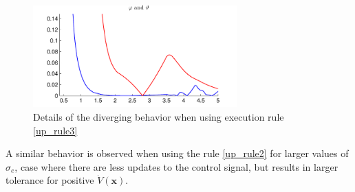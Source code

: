 \documentclass{article}
\begin{document}
			\begin{figure}
				\centering
				\includegraphics[width=0.7\textwidth]{event_detail1}
				\caption{Details of the diverging behavior when using execution rule \eqref{up_rule3} \label{event_details1}}
			\end{figure}
			A similar behavior is observed when using the rule \eqref{up_rule2} for larger values of $\sigma_e$, case where there are less updates to the control signal, but results in larger tolerance for positive $\dot V(\mathbf{x})$. 
\end{document}
